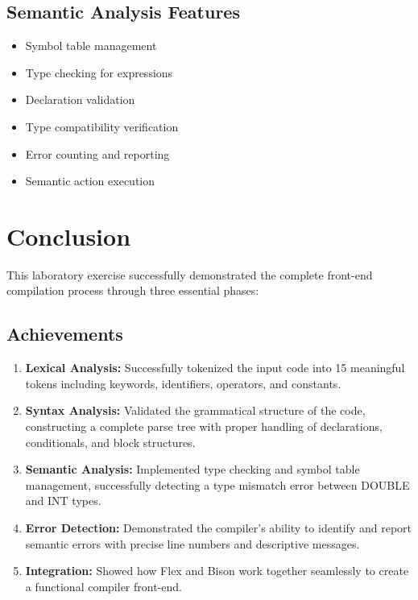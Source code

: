 \documentclass[12pt,a4paper]{article}
\begin{document}
\subsection{Semantic Analysis Features}
\begin{itemize}
    \item Symbol table management
    \item Type checking for expressions
    \item Declaration validation
    \item Type compatibility verification
    \item Error counting and reporting
    \item Semantic action execution
\end{itemize}

\section{Conclusion}

This laboratory exercise successfully demonstrated the complete front-end compilation process through three essential phases:

\subsection{Achievements}

\begin{enumerate}
    \item \textbf{Lexical Analysis:} Successfully tokenized the input code into 15 meaningful tokens including keywords, identifiers, operators, and constants.
    
    \item \textbf{Syntax Analysis:} Validated the grammatical structure of the code, constructing a complete parse tree with proper handling of declarations, conditionals, and block structures.
    
    \item \textbf{Semantic Analysis:} Implemented type checking and symbol table management, successfully detecting a type mismatch error between DOUBLE and INT types.
    
    \item \textbf{Error Detection:} Demonstrated the compiler's ability to identify and report semantic errors with precise line numbers and descriptive messages.
    
    \item \textbf{Integration:} Showed how Flex and Bison work together seamlessly to create a functional compiler front-end.
\end{enumerate}
\end{document}
